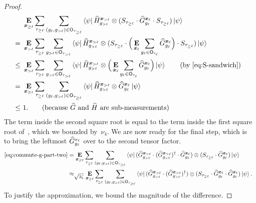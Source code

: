 \begin{proof}
\begin{align*}
&\E_{\bx_{\geq \ell}} \sum_{\tau_{\geq \ell}}  \sum_{(g_{\ell}, g_{>\ell}) \in \sfO_{\tau_{\geq \ell}}}
    \bra{\psi}
    \wH^{\bx_{>\ell}}_{g_{>\ell}}
     \ot (S_{\tau_{\geq \ell}} \cdot
    \wG^{\bx_{\ell}}_{g_\ell}  \cdot S_{\tau_{\geq \ell}})
    \ket{\psi}\\
=~&\E_{\bx_{> \ell}} \sum_{\tau_{\geq \ell}}  \sum_{g_{>\ell} \in \sfO_{\tau_{> \ell}}}
    \bra{\psi}
    \wH^{\bx_{>\ell}}_{g_{>\ell}}
     \ot (S_{\tau_{\geq \ell}} \cdot
    \Big(\E_{\bx_{\ell}} \sum_{g_{\ell} \in \sfO_{\tau_{\ell}}}\wG^{\bx_{\ell}}_{g_\ell}  \Big)\cdot S_{\tau_{\geq \ell}})
    \ket{\psi}\\
\leq~&\E_{\bx_{> \ell}} \sum_{\tau_{\geq \ell}}  \sum_{g_{>\ell} \in \sfO_{\tau_{> \ell}}}
    \bra{\psi}
    \wH^{\bx_{>\ell}}_{g_{>\ell}}
     \ot 
    \Big(\E_{\bx_{\ell}} \sum_{g_{\ell} \in \sfO_{\tau_{\ell}}}\wG^{\bx_{\ell}}_{g_\ell}  \Big)
    \ket{\psi} \tag{by~\Cref{eq:S-sandwich}}\\
=~&\E_{\bx_{\geq \ell}} \sum_{\tau_{\geq \ell}}  \sum_{(g_{\ell}, g_{>\ell}) \in \sfO_{\tau_{\geq \ell}}}
    \bra{\psi}
    \wH^{\bx_{>\ell}}_{g_{>\ell}}
     \ot
    \wG^{\bx_{\ell}}_{g_\ell}  
    \ket{\psi}\\
\leq~& 1. \tag{because $\wG$ and $\wH$ are sub-measurements}
\end{align*}
The term inside the second square root is equal to the term inside the first square root of~, which we bounded by~$\nu_4$.
We are now ready for the final step, which is to bring the leftmost
$\widehat{G}^{x_\ell}_{g_\ell}$ over to the second tensor factor.
\begin{align}
  \eqref{eq:commute-g-part-two} &= 
  \mathop{\bf E\/}_{{\boldsymbol{x}}_{\geq \ell}} \sum_{\tau_{\geq \ell}}  \sum_{(g_{\ell}, g_{>\ell}) \in \mathsf{O}_{\tau_{\geq \ell}}}
	\bra{\psi} (\widehat{G}^{{\boldsymbol{x}}_{> \ell}}_{g_{> \ell}} \cdot (\widehat{G}^{{\boldsymbol{x}}_{> \ell}}_{g_{> \ell}})^\dagger \cdot \widehat{G}^{{\boldsymbol{x}}_{\ell}}_{g_{\ell}}) \otimes (S_{\tau_{\geq \ell}} \cdot \widehat{G}^{{\boldsymbol{x}}_{\ell}}_{g_{\ell}})\ket{\psi}\nonumber\\
  &\approx_{\sqrt{2\zeta}} \mathop{\bf E\/}_{{\boldsymbol{x}}_{\geq \ell}} \sum_{\tau_{\geq \ell}}  \sum_{(g_{\ell}, g_{>\ell}) \in \mathsf{O}_{\tau_{\geq \ell}}}
	\bra{\psi} (\widehat{G}^{{\boldsymbol{x}}_{> \ell}}_{g_{> \ell}} \cdot (\widehat{G}^{{\boldsymbol{x}}_{> \ell}}_{g_{> \ell}})^\dagger) \otimes (S_{\tau_{\geq \ell}} \cdot \widehat{G}^{{\boldsymbol{x}}_{\ell}}_{g_{\ell}}\cdot \widehat{G}^{{\boldsymbol{x}}_{\ell}}_{g_{\ell}})\ket{\psi}. \label{eq:h-ot-mgg}
\end{align}
To justify the approximation, we bound the magnitude of the
difference.

\end{proof}
